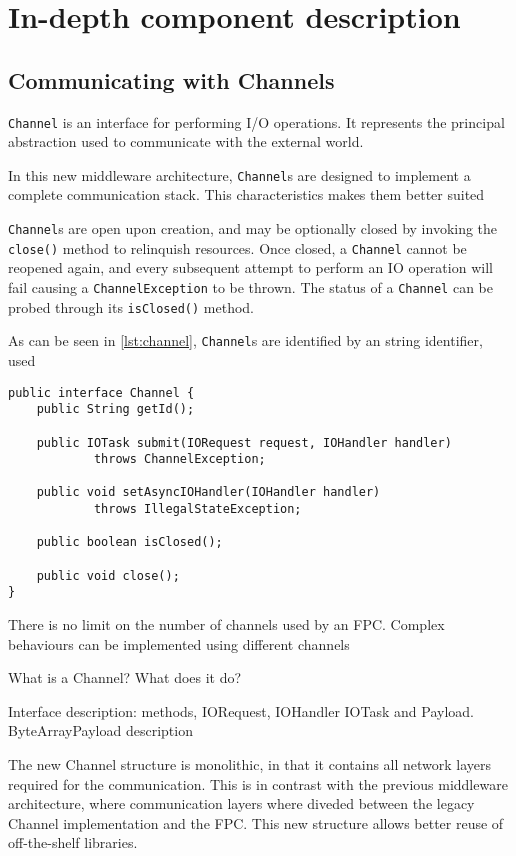 \chapter{In-depth component description}

\section{Communicating with Channels}

\texttt{Channel} is an interface for performing I/O operations. It represents the principal abstraction used to communicate with the external world.

In this new middleware architecture, \texttt{Channel}s are designed to implement a complete communication stack. This characteristics makes them better suited

\texttt{Channel}s are open upon creation, and may be optionally closed by invoking the \texttt{close()} method to relinquish resources. Once closed, a \texttt{Channel} cannot be reopened again, and every subsequent attempt to perform an IO operation will fail causing a \texttt{ChannelException} to be thrown. The status of a \texttt{Channel} can be probed through its \texttt{isClosed()} method.

As can be seen in \ref{lst:channel}, \texttt{Channel}s are identified by an string identifier, used 


\lstset{language=Java}
\begin{lstlisting}[caption=The Channel interface,label={lst:channel}]
public interface Channel {
	public String getId();
	
	public IOTask submit(IORequest request, IOHandler handler)
			throws ChannelException;
	
	public void setAsyncIOHandler(IOHandler handler)
			throws IllegalStateException;
			
	public boolean isClosed();
	
	public void close();		
}
\end{lstlisting}

There is no limit on the number of channels used by an FPC. Complex behaviours can be implemented using different channels

What is a Channel? What does it do?

Interface description: methods, IORequest, IOHandler IOTask and Payload.
ByteArrayPayload description

The new Channel structure is monolithic, in that it contains all network layers required for the communication. This is in contrast with the previous middleware architecture, where communication layers where diveded between the legacy Channel implementation and the FPC. This new structure allows better reuse of off-the-shelf libraries.

